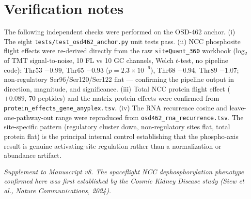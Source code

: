 \documentclass[10pt]{article}
\newcommand{\code}[1]{\texttt{#1}}
\begin{document}
\section{Verification notes}

The following independent checks were performed on the OSD-462 anchor. (i) The eight \code{tests/test\_osd462\_anchor.py} unit tests pass. (ii) NCC phosphosite flight effects were re-derived directly from the raw \code{siteQuant\_360} workbook (log$_2$ of TMT signal-to-noise, 10 FL vs 10 GC channels, Welch $t$-test, no pipeline code): Thr53 $-0.99$, Thr65 $-0.93$ ($p=2.3\times10^{-6}$), Thr68 $-0.94$, Thr89 $-1.07$; non-regulatory Ser96/Ser120/Ser122 flat --- confirming the pipeline output in direction, magnitude, and significance. (iii) Total NCC protein flight effect ($+0.089$, 70 peptides) and the matrix-protein effects were confirmed from \code{protein\_effects\_gene\_anyplex.tsv}. (iv) The RNA recurrence cosine and leave-one-pathway-out range were reproduced from \code{osd462\_rna\_recurrence.tsv}. The site-specific pattern (regulatory cluster down, non-regulatory sites flat, total protein flat) is the principal internal control establishing that the phospho-axis result is genuine activating-site regulation rather than a normalization or abundance artifact.

\vspace{1em}
\noindent\itshape Supplement to Manuscript v8. The spaceflight NCC dephosphorylation phenotype confirmed here was first established by the Cosmic Kidney Disease study (Siew et al., \emph{Nature Communications}, 2024).
\end{document}

